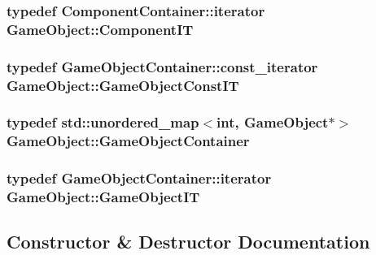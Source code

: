 \subsubsection[{\texorpdfstring{Component\+IT}{ComponentIT}}]{\setlength{\rightskip}{0pt plus 5cm}typedef Component\+Container\+::iterator {\bf Game\+Object\+::\+Component\+IT}}\hypertarget{classGameObject_ab17e7f4a9628567d8c1bbdb2c2cf42ae}{}\label{classGameObject_ab17e7f4a9628567d8c1bbdb2c2cf42ae}
\subsubsection[{\texorpdfstring{Game\+Object\+Const\+IT}{GameObjectConstIT}}]{\setlength{\rightskip}{0pt plus 5cm}typedef Game\+Object\+Container\+::const\+\_\+iterator {\bf Game\+Object\+::\+Game\+Object\+Const\+IT}}\hypertarget{classGameObject_ac7d3edce4c190f8e784d7824dbf81713}{}\label{classGameObject_ac7d3edce4c190f8e784d7824dbf81713}
\subsubsection[{\texorpdfstring{Game\+Object\+Container}{GameObjectContainer}}]{\setlength{\rightskip}{0pt plus 5cm}typedef std\+::unordered\+\_\+map$<$int, {\bf Game\+Object}$\ast$$>$ {\bf Game\+Object\+::\+Game\+Object\+Container}}\hypertarget{classGameObject_aeef18cd85b020970fc7e33bb1d0f834e}{}\label{classGameObject_aeef18cd85b020970fc7e33bb1d0f834e}
\subsubsection[{\texorpdfstring{Game\+Object\+IT}{GameObjectIT}}]{\setlength{\rightskip}{0pt plus 5cm}typedef Game\+Object\+Container\+::iterator {\bf Game\+Object\+::\+Game\+Object\+IT}}\hypertarget{classGameObject_afd3721c500c5f9e2f502e017df75f348}{}\label{classGameObject_afd3721c500c5f9e2f502e017df75f348}


\subsection{Constructor \& Destructor Documentation}
